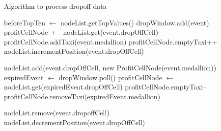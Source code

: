\begin{algorithm}
\caption{Algorithm to process dropoff data}
\label{dropoff_algorithm}
\begin{algorithmic}
\small
\STATE beforeTopTen $ \leftarrow $ nodeList.getTopValues()
\STATE dropWindow.add(event)
	\STATE profitCellNode $ \leftarrow $ nodeList.get(event.dropOffCell)
	\STATE profitCellNode.addTaxi(event.medallion)
	\STATE profitCellNode.emptyTaxi++
	\STATE nodeList.incrementPosition(event.dropOffCell)	

\ELSE
	\STATE nodeList.add(event.dropOffCell, new ProfitCellNode(event.medallion))
\ENDIF
{}
	\STATE expiredEvent $ \leftarrow $ dropWindow.poll()
	\STATE profitCellNode $ \leftarrow $ nodeList.get(expiredEvent.dropOffCell)
		\STATE profitCellNode.emptyTaxi--
		\STATE profitCellNode.removeTaxi(expiredEvent.medallion)
		
			\STATE nodeList.remove(event.dropoffCell)
		\ELSE 
			\STATE nodeList.decrementPosition(event.dropOffCell) 
		\ENDIF
	\ENDIF
\ENDWHILE

\end{algorithmic}
\end{algorithm}





